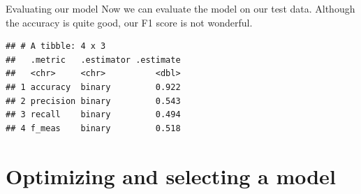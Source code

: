 \documentclass[
  10pt,
  ignorenonframetext,
  aspectratio=169]{beamer}
\newenvironment{Shaded}{\begin{snugshade}}{\end{snugshade}}
\newcommand{\AttributeTok}[1]{\textcolor[rgb]{0.80,0.80,0.80}{#1}}
\newcommand{\FunctionTok}[1]{\textcolor[rgb]{0.94,0.94,0.56}{#1}}
\newcommand{\NormalTok}[1]{\textcolor[rgb]{0.80,0.80,0.80}{#1}}
\newcommand{\OtherTok}[1]{\textcolor[rgb]{0.94,0.94,0.56}{#1}}
\newcommand{\SpecialCharTok}[1]{\textcolor[rgb]{0.86,0.64,0.64}{#1}}
\newcommand{\StringTok}[1]{\textcolor[rgb]{0.80,0.58,0.58}{#1}}
\begin{document}
\begin{frame}[fragile]{Evaluating our model}
\protect\hypertarget{evaluating-our-model-1}{}
Now we can evaluate the model on our test data. Although the accuracy is
quite good, our F1 score is not wonderful.

\medskip
\scriptsize

\begin{Shaded}
\end{Shaded}

\begin{verbatim}
## # A tibble: 4 x 3
##   .metric   .estimator .estimate
##   <chr>     <chr>          <dbl>
## 1 accuracy  binary         0.922
## 2 precision binary         0.543
## 3 recall    binary         0.494
## 4 f_meas    binary         0.518
\end{verbatim}
\end{frame}

\hypertarget{optimizing-and-selecting-a-model}{%
\section{Optimizing and selecting a
model}\label{optimizing-and-selecting-a-model}}
\end{document}
